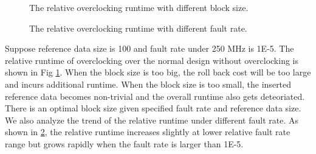 \begin{figure}
    \caption{The relative overclocking runtime with different block size.}
\label{fig:cost_block}
\vspace{-1em}
\end{figure}

\begin{figure}
    \caption{The relative overclocking runtime with different fault rate.}
\label{fig:cost_probability}
\vspace{-1em}
\end{figure}


Suppose reference data size is 100 and fault rate under 250 MHz is 1E-5. The relative runtime 
of overclocking over the normal design without overclocking is shown 
in Fig \ref{fig:cost_block}. When the block size is too big, the roll back cost will be 
too large and incurs additional runtime. When the block size is too small, the inserted 
reference data becomes non-trivial and the overall runtime also gets deteoriated. There is 
an optimal block size given specified fault rate and reference data size.
We also analyze the trend of the relative runtime under different fault rate.
As shown in \ref{fig:cost_probability}, the relative runtime increases slightly at 
lower relative fault rate range but grows rapidly when the fault rate is larger than 1E-5.


